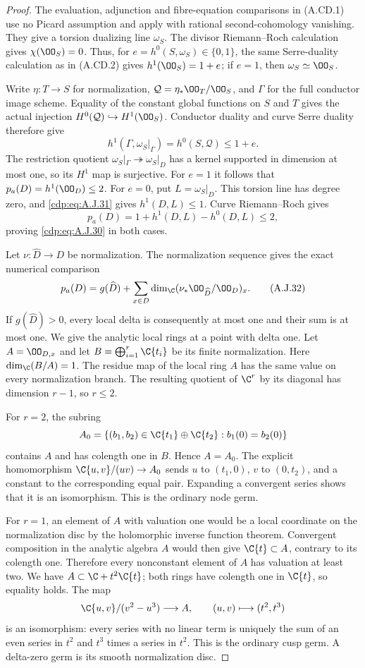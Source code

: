 \begin{proof}
The evaluation, adjunction and fibre-equation comparisons
in (A.CD.1) use no Picard assumption and apply with
rational second-cohomology vanishing. They give a torsion
dualizing line $\omega_S$. The divisor Riemann--Roch
calculation gives $\chi(\OO_S)=0$. Thus, for
$e=h^0(S,\omega_S)\in\{0,1\}$, the same Serre-duality
calculation as in (A.CD.2) gives
$h^1(\OO_S)=1+e$; if $e=1$, then
$\omega_S\simeq\OO_S$.

Write $\eta:T\to S$ for normalization,
$\mathcal Q=\eta_*\OO_T/\OO_S$, and $\Gamma$ for
the full conductor image scheme. Equality of the
constant global functions on $S$ and $T$ gives the
actual injection $H^0(\mathcal Q)\hookrightarrow
H^1(\OO_S)$. Conductor duality and curve Serre duality
therefore give
\[
 h^1(\Gamma,\omega_S|_\Gamma)
       =h^0(S,\mathcal Q)\le1+e.                  \tag{A.J.31}\label{cdp:eq:A.J.31}
\]
The restriction quotient
$\omega_S|_\Gamma\twoheadrightarrow\omega_S|_D$
has a kernel supported in dimension at most one, so
its $H^1$ map is surjective. For $e=1$ it follows that
$p_a(D)=h^1(\OO_D)\le2$. For $e=0$, put
$L=\omega_S|_D$. This torsion line has degree zero,
and \eqref{cdp:eq:A.J.31} gives $h^1(D,L)\le1$. Curve
Riemann--Roch gives
\[
 p_a(D)=1+h^1(D,L)-h^0(D,L)\le2,
\]
proving \eqref{cdp:eq:A.J.30} in both cases.

Let $\nu:\widehat D\to D$ be normalization. The
normalization sequence gives the exact numerical
comparison
\[
 p_a(D)=g(\widehat D)+
        \sum_{x\in D}\dim_{\C}
          (\nu_*\OO_{\widehat D}/\OO_D)_x.       \tag{A.J.32}\label{cdp:eq:A.J.32}
\]
If $g(\widehat D)>0$, every local delta is consequently
at most one and their sum is at most one. We give the
analytic local rings at a point with delta one.
Let $A=\OO_{D,x}$ and let
$B=\bigoplus_{i=1}^r\C\{t_i\}$ be its finite
normalization. Here $\dim_{\C}(B/A)=1$. The residue map
of the local ring $A$ has the same value on every
normalization branch. The resulting quotient of
$\C^r$ by its diagonal has dimension $r-1$, so
$r\le2$.

For $r=2$, the subring
\[
 A_0=\{(b_1,b_2)\in\C\{t_1\}\oplus\C\{t_2\}:
                                  b_1(0)=b_2(0)\}
\]
contains $A$ and has colength one in $B$. Hence
$A=A_0$. The explicit homomorphism
$\C\{u,v\}/(uv)\to A_0$ sends
$u$ to $(t_1,0)$, $v$ to $(0,t_2)$, and a constant
to the corresponding equal pair. Expanding a
convergent series shows that it is an isomorphism.
This is the ordinary node germ.

For $r=1$, an element of $A$ with valuation one would
be a local coordinate on the normalization disc by
the holomorphic inverse function theorem. Convergent
composition in the analytic algebra $A$ would then
give $\C\{t\}\subset A$, contrary to its colength
one. Therefore every nonconstant element of $A$ has
valuation at least two. We have
$A\subset\C+t^2\C\{t\}$; both rings have
colength one in $\C\{t\}$, so equality holds.
The map
\[
 \C\{u,v\}/(v^2-u^3)\longrightarrow A,
                 \qquad (u,v)\longmapsto(t^2,t^3)
\]
is an isomorphism: every series with no linear term
is uniquely the sum of an even series in $t^2$ and
$t^3$ times a series in $t^2$. This is the ordinary
cusp germ. A delta-zero germ is its smooth
normalization disc.


\end{proof}

